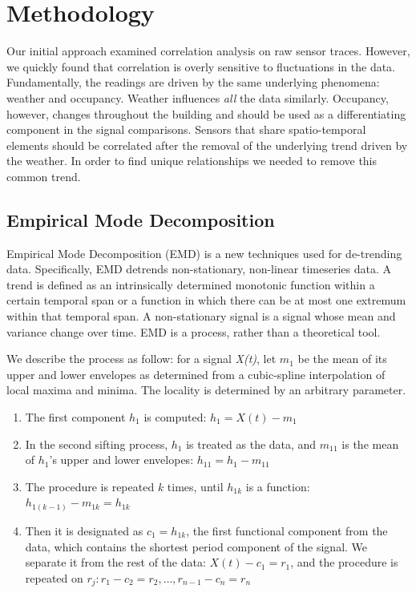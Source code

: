 \section{Methodology}\label{method}

Our initial approach examined correlation analysis on raw sensor traces.  However, we quickly
found that correlation is overly sensitive to fluctuations in the data.
Fundamentally, the readings are driven by the same underlying phenomena: 
weather and occupancy.  Weather influences \emph{all} the data similarly.  Occupancy, however, changes
throughout the building and should be used as a differentiating component in the signal
comparisons.  Sensors that share spatio-temporal elements should be correlated after the removal
of the underlying trend driven by the weather.  In order to find unique relationships we needed to remove 
this common trend.

\subsection{Empirical Mode Decomposition}
Empirical Mode Decomposition (EMD) \cite{huang:emd1998} is a new techniques used for de-trending data.
Specifically, EMD detrends non-stationary, non-linear timeseries data.  A trend is defined as 
an intrinsically determined monotonic function within a certain temporal span or a function in which there 
can be at most one extremum within that temporal span.  A non-stationary signal is a signal whose mean and
variance change over time.  EMD is a process, rather than a theoretical tool.

We describe the process as follow:  for a signal \emph{X(t)}, let $m_1$ be the mean of its upper and
lower envelopes as determined from a cubic-spline interpolation of local maxima and minima. The locality 
is determined by an arbitrary parameter.

\begin{enumerate}
\item The first component $h_1$ is computed: $h_1=X(t)-m_1$
\item In the second sifting process, $h_1$ is treated as the data, and $m_{11}$ is the mean of $h_1$'s upper and lower envelopes: $h_{11}=h_1-m_{11}$
\item The procedure is repeated $k$ times, until $h_{1k}$ is a function: $h_{1(k-1)}-m_{1k}=h_{1k}$
\item Then it is designated as $c_1=h_{1k}$, the first functional component from the data, which contains the shortest period component of the signal. We separate it from the rest of the data: $X(t)-c_1 = r_1$, and the procedure is
repeated on $r_j: r_1-c_2 = r_2,\dots,r_{n-1} - c_n = r_n$
\end{enumerate}

